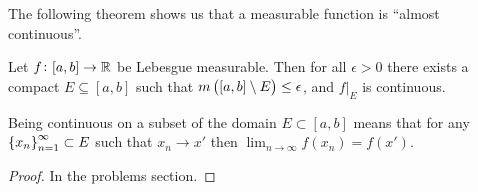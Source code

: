 \documentclass[11pt,a4paper]{article}
\begin{document}
\begin{remark}
  The following theorem shows us that a measurable function
  is ``almost continuous''.
\end{remark}
\begin{theorem}
  Let $f \colon [a,b] \to \mathbb{R}$ be Lebesgue measurable.
  Then for all $\epsilon > 0$ there exists a compact $E \subseteq [a,b]$
  such that $m\del{[a,b] \setminus E} \le \epsilon$,
  and $f\vert_E$ is continuous.
\end{theorem}
\begin{remark}
  Being continuous on a subset of the domain $E \subset [a,b]$
  means that for any $\left\{x_n\right\}_{n=1}^{\infty} \subset E$ such that
  $x_n \to x'$ then $\lim_{n\to\infty} f(x_n) = f(x')$.
\end{remark}
\begin{proof}
  In the problems section.
\end{proof}

\end{document}
